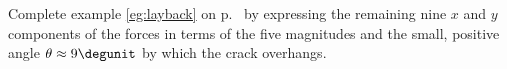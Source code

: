 Complete example \ref{eg:layback} on p.~\pageref{eg:layback} by expressing
the remaining nine $x$ and $y$ components of the forces in terms of the five magnitudes
and the small, positive angle $\theta\approx9\degunit$ by which the crack overhangs.
\answercheck

